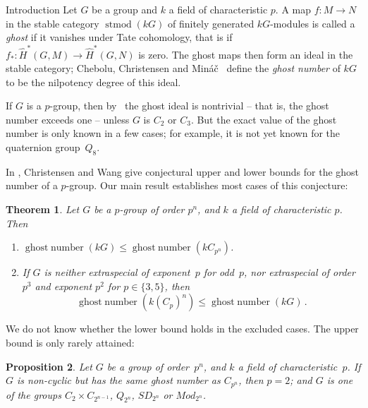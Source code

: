 \documentclass[12pt,reqno]{amsart}
\newtheorem{thm}{Theorem}[section]
\newtheorem{pro}[thm]{Proposition}
\theoremstyle{definition}
\theoremstyle{remark}
\begin{document}
\maketitle
\begin{section} {Introduction}
Let $G$ be a group and $k$ a field of characteristic $p$. A map $f \colon M \rightarrow N$ in the stable category $\operatorname{stmod}(kG)$ of finitely generated $kG$-modules is called a \emph{ghost} if it vanishes under Tate cohomology, that is if $f_* \colon \hat{H}^*(G,M) \rightarrow \hat{H}^*(G,N)$ is zero. The ghost maps then form an ideal in the stable category; Chebolu, Christensen and Min\'{a}\v{c}~\cite{CheboluChristensenMinac:ghosts} define the \emph{ghost number} of $kG$ to be the nilpotency degree of this ideal.

If $G$ is a $p$-group, then by~\cite{BensonCheboluChristensenMinac:genHyp} the ghost ideal is nontrivial -- that is, the ghost number exceeds one -- unless $G$ is $C_2$ or $C_3$\@.
But the exact value of the ghost number is only known in a few cases; for example, it is not yet known for the quaternion group~$Q_8$.

In \cite{ChristensenWang:ghostNumbers},  Christensen and Wang give conjectural upper and lower bounds for the ghost number of a $p$-group. Our main result establishes most cases of this conjecture:

\begin{thm}
\label{main1}
Let $G$ be a $p$-group of order $p^n$, and $k$ a field of characteristic $p$. Then
\begin{enumerate}
\item \label{enum:main-1}
${\operatorname{ghost\;number}}(kG) \leq {\operatorname{ghost\;number}}(kC_{p^n})$\@.
\item \label{enum:main-2}
If $G$ is neither extraspecial of exponent~$p$ for odd~$p$, nor extraspecial of order $p^3$ and exponent $p^2$ for $p \in \{3,5\}$, then
\[
{\operatorname{ghost\;number}}(k(C_p)^n) \leq {\operatorname{ghost\;number}}(kG) \, .
\]
\end{enumerate}
\end{thm}

\noindent
We do not know whether the lower bound holds in the excluded cases.
The upper bound is only rarely attained:

\begin{pro}
\label{pro:upperBoundPlus}
Let $G$ be a group of order~$p^n$, and $k$ a field of characteristic~$p$.
If $G$ is non-cyclic but has the same ghost number as $C_{p^n}$, then $p=2$; and $G$ is one of the groups $C_2 \times C_{2^{n-1}}$, $Q_{2^n}$, $\mathit{SD}_{2^n}$ or $\mathit{Mod}_{2^n}$.
\end{pro}


\end{section}
\end{document}
